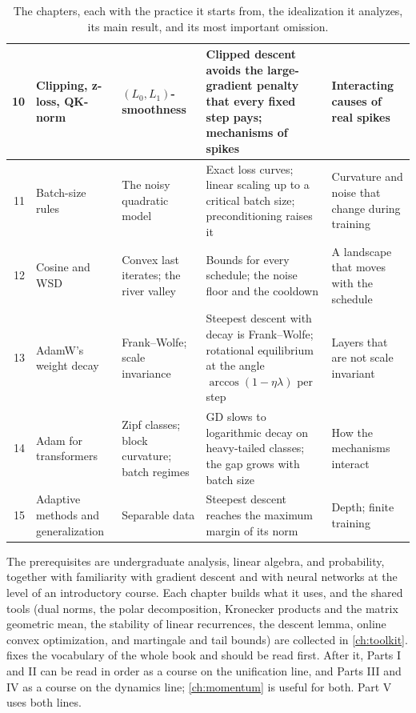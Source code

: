 \begin{refsection}
\begin{table}[p]
\begin{fullwidth}
\begin{tabular}{@{}r>{\raggedright\arraybackslash}p{28mm}>{\raggedright\arraybackslash}p{32mm}>{\raggedright\arraybackslash}p{50mm}>{\raggedright\arraybackslash}p{38mm}@{}}
10 & Clipping, z-loss, QK-norm & $(L_0,L_1)$-smoothness & Clipped descent avoids the large-gradient penalty that every fixed step pays; mechanisms of spikes & Interacting causes of real spikes\\
\midrule
11 & Batch-size rules & The noisy quadratic model & Exact loss curves; linear scaling up to a critical batch size; preconditioning raises it & Curvature and noise that change during training\\
12 & Cosine and WSD & Convex last iterates; the river valley & Bounds for every schedule; the noise floor and the cooldown & A landscape that moves with the schedule\\
13 & AdamW's weight decay & Frank--Wolfe; scale invariance & Steepest descent with decay is Frank--Wolfe; rotational equilibrium at the angle $\arccos(1-\eta\lambda)$ per step & Layers that are not scale invariant\\
\midrule
14 & Adam for transformers & Zipf classes; block curvature; batch regimes & GD slows to logarithmic decay on heavy-tailed classes; the gap grows with batch size & How the mechanisms interact\\
15 & Adaptive methods and generalization & Separable data & Steepest descent reaches the maximum margin of its norm & Depth; finite training\\
\bottomrule
\end{tabular}
\caption{The chapters, each with the practice it starts from, the idealization it analyzes, its main result, and its most important omission.}
\label{tab:prologue:map}
\end{fullwidth}
\end{table}


The prerequisites are undergraduate analysis, linear algebra, and probability, together with familiarity with gradient descent and with neural networks at the level of an introductory course. Each chapter builds what it uses, and the shared tools (dual norms, the polar decomposition, Kronecker products and the matrix geometric mean, the stability of linear recurrences, the descent lemma, online convex optimization, and martingale and tail bounds) are collected in \cref{ch:toolkit}.  fixes the vocabulary of the whole book and should be read first. After it, Parts I and II can be read in order as a course on the unification line, and Parts III and IV as a course on the dynamics line; \cref{ch:momentum} is useful for both. Part V uses both lines.


\end{refsection}
